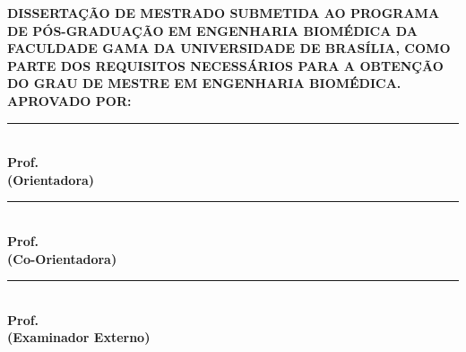 \begin{folhadeaprovacao}
\begin{center}
    \vspace*{0in}
	{\textbf{\imprimirinstituicao}}
	\par
	{\textbf{\imprimirdepartamento}}

	\vspace{0.5 in}
	{\textbf{\large \imprimirtitulo}}
    	\vspace{0.25 in}
    	\par
         {\textbf{\large \imprimirautor}}
    	\vspace{0.25 in}
\end{center}
\textbf{DISSERTAÇÃO DE MESTRADO SUBMETIDA AO PROGRAMA DE PÓS-GRADUAÇÃO EM ENGENHARIA BIOMÉDICA DA FACULDADE GAMA DA
UNIVERSIDADE DE BRASÍLIA, COMO PARTE DOS REQUISITOS NECESSÁRIOS PARA A OBTENÇÃO DO GRAU DE MESTRE EM
ENGENHARIA BIOMÉDICA.}
\flushleft	
	\vspace{0.5 in}    
    \textbf{APROVADO POR:}\\
    \vspace{0.5 in}    
    \rule{10cm}{.1mm}\\
    {\textbf{Prof. \imprimirorientador} \\ \textbf{(Orientadora)} }\\
    \vspace{0.5 in}    
   \rule{10cm}{.1mm}\\ 
   {\textbf{Prof. \imprimirmembroCoorientador} \\ \textbf{(Co-Orientadora)}}\\
    \vspace{0.5 in}    
   \rule{10cm}{.1mm}\\
    {\textbf{Prof. \imprimirmembroconvidadodois} \\ \textbf{(Examinador Externo)}}\\
    
    \end{folhadeaprovacao}
